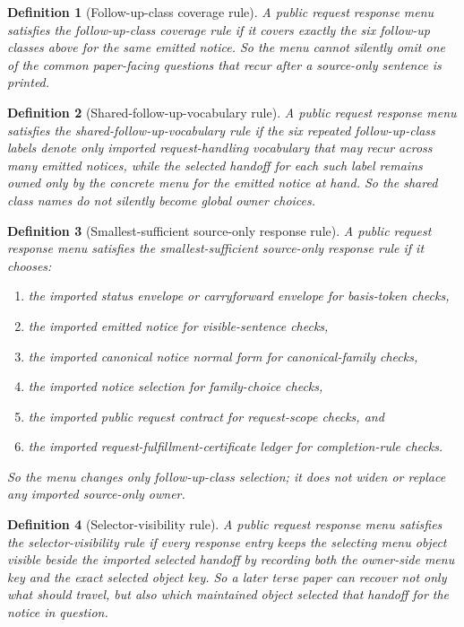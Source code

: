 \documentclass[11pt]{article}
\newtheorem{definition}{Definition}
\begin{document}
\begin{definition}[Follow-up-class coverage rule]
A public request response menu satisfies the \emph{follow-up-class coverage rule} if it covers exactly the six follow-up classes above for the same emitted notice.
So the menu cannot silently omit one of the common paper-facing questions that recur after a source-only sentence is printed.
\end{definition}

\begin{definition}[Shared-follow-up-vocabulary rule]
A public request response menu satisfies the \emph{shared-follow-up-vocabulary rule} if the six repeated follow-up-class labels denote only imported request-handling vocabulary that may recur across many emitted notices, while the selected handoff for each such label remains owned only by the concrete menu for the emitted notice at hand.
So the shared class names do not silently become global owner choices.
\end{definition}

\begin{definition}[Smallest-sufficient source-only response rule]
A public request response menu satisfies the \emph{smallest-sufficient source-only response rule} if it chooses:
\begin{enumerate}[leftmargin=*]
\item the imported status envelope or carryforward envelope for basis-token checks,
\item the imported emitted notice for visible-sentence checks,
\item the imported canonical notice normal form for canonical-family checks,
\item the imported notice selection for family-choice checks,
\item the imported public request contract for request-scope checks, and
\item the imported request-fulfillment-certificate ledger for completion-rule checks.
\end{enumerate}
So the menu changes only follow-up-class selection; it does not widen or replace any imported source-only owner.
\end{definition}

\begin{definition}[Selector-visibility rule]
A public request response menu satisfies the \emph{selector-visibility rule} if every response entry keeps the selecting menu object visible beside the imported selected handoff by recording both the owner-side menu key and the exact selected object key. So a later terse paper can recover not only what should travel, but also which maintained object selected that handoff for the notice in question.
\end{definition}
\end{document}
